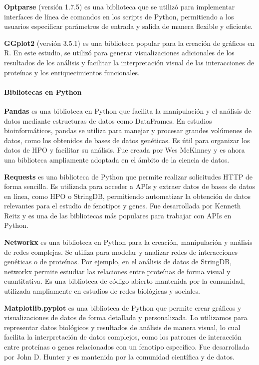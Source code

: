 \textbf{Optparse} (versión 1.7.5) es una biblioteca que se utilizó para implementar interfaces de línea de comandos en los scripts de Python, permitiendo a los usuarios especificar parámetros de entrada y salida de manera flexible y eficiente.\cite{optparse}

\textbf{GGplot2} (versión 3.5.1) es una biblioteca popular para la creación de gráficos en R. En este estudio, se utilizó para generar visualizaciones adicionales de los resultados de los análisis y facilitar la interpretación visual de las interacciones de proteínas y los enriquecimientos funcionales. \cite{ggplot2}


\paragraph{Bibliotecas en Python}

\textbf{Pandas} es una biblioteca en Python que facilita la manipulación y el análisis de datos mediante estructuras de datos como DataFrames.
En estudios bioinformáticos, pandas se utiliza para manejar y procesar grandes volúmenes de datos, como los obtenidos de bases de datos genéticas. Es útil para organizar los datos de HPO y facilitar su análisis.
Fue creada por Wes McKinney y es ahora una biblioteca ampliamente adoptada en el ámbito de la ciencia de datos.\cite{mckinney2011pandas}


\textbf{Requests} es una biblioteca de Python que permite realizar solicitudes HTTP de forma sencilla.
Es utilizada para acceder a APIs y extraer datos de bases de datos en línea, como HPO o StringDB, permitiendo automatizar la obtención de datos relevantes para el estudio de fenotipos y genes.
Fue desarrollada por Kenneth Reitz y es una de las bibliotecas más populares para trabajar con APIs en Python.\cite{chandra2015python}


\textbf{Networkx} es una biblioteca en Python para la creación, manipulación y análisis de redes complejas.
Se utiliza para modelar y analizar redes de interacciones genéticas o de proteínas. Por ejemplo, en el análisis de datos de StringDB, networkx permite estudiar las relaciones entre proteínas de forma visual y cuantitativa.
Es una biblioteca de código abierto mantenida por la comunidad, utilizada ampliamente en estudios de redes biológicas y sociales.\cite{hagberg2020networkx}


\textbf{Matplotlib.pyplot} es una biblioteca de Python que permite crear gráficos y visualizaciones de datos de forma detallada y personalizada.
Lo utilizamos para representar datos biológicos y resultados de análisis de manera visual, lo cual facilita la interpretación de datos complejos, como los patrones de interacción entre proteínas o genes relacionados con un fenotipo específico.
Fue desarrollada por John D. Hunter y es mantenida por la comunidad científica y de datos.\cite{ari2014matplotlib}



